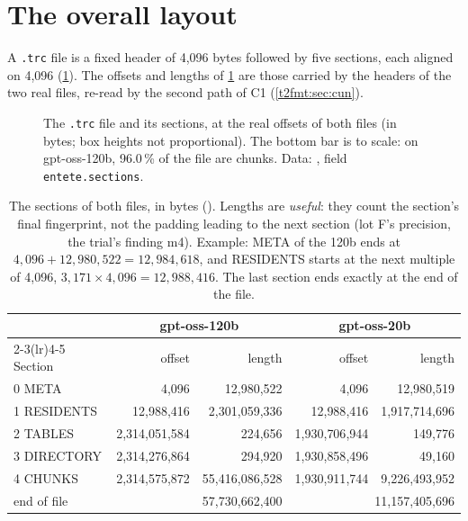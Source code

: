 \section{The overall layout}\label{t2fmt:sec:disposition}

A \texttt{.trc} file is a fixed header of 4{,}096 bytes followed by five sections, each aligned on 4{,}096 (\cref{t2fmt:fig:fichier}). The offsets and lengths of \cref{t2fmt:tab:sections} are those carried by the headers of the two real files, re-read by the second path of C1 (\cref{t2fmt:sec:cun}).

\begin{figure}[ht]
\centering
\TdFmtFichier
\caption[The .trc file, its sections]{The \texttt{.trc} file and its sections, at the real offsets of both files (in bytes; box heights not proportional). The bottom bar is to scale: on gpt-oss-120b, 96.0\,\% of the file are chunks. Data: , field \texttt{entete.sections}.}
\label{t2fmt:fig:fichier}
\end{figure}

\begin{table}[ht]
\centering\small
\begin{tabular}{l r r r r}
\toprule
& \multicolumn{2}{c}{gpt-oss-120b} & \multicolumn{2}{c}{gpt-oss-20b} \\
\cmidrule(lr){2-3}\cmidrule(lr){4-5}
Section & offset & length & offset & length \\
\midrule
0 META & 4{,}096 & 12{,}980{,}522 & 4{,}096 & 12{,}980{,}519 \\
1 RESIDENTS & 12{,}988{,}416 & 2{,}301{,}059{,}336 & 12{,}988{,}416 & 1{,}917{,}714{,}696 \\
2 TABLES & 2{,}314{,}051{,}584 & 224{,}656 & 1{,}930{,}706{,}944 & 149{,}776 \\
3 DIRECTORY & 2{,}314{,}276{,}864 & 294{,}920 & 1{,}930{,}858{,}496 & 49{,}160 \\
4 CHUNKS & 2{,}314{,}575{,}872 & 55{,}416{,}086{,}528 & 1{,}930{,}911{,}744 & 9{,}226{,}493{,}952 \\
\midrule
end of file & \multicolumn{2}{r}{57{,}730{,}662{,}400} & \multicolumn{2}{r}{11{,}157{,}405{,}696} \\
\bottomrule
\end{tabular}
\caption[The sections of both files]{The sections of both files, in bytes (). Lengths are \emph{useful}: they count the section's final fingerprint, not the padding leading to the next section (lot F's precision, the trial's finding m4). Example: META of the 120b ends at $4{,}096 + 12{,}980{,}522 = 12{,}984{,}618$, and RESIDENTS starts at the next multiple of 4{,}096, $3{,}171 \times 4{,}096 = 12{,}988{,}416$. The last section ends exactly at the end of the file.}
\label{t2fmt:tab:sections}
\end{table}

